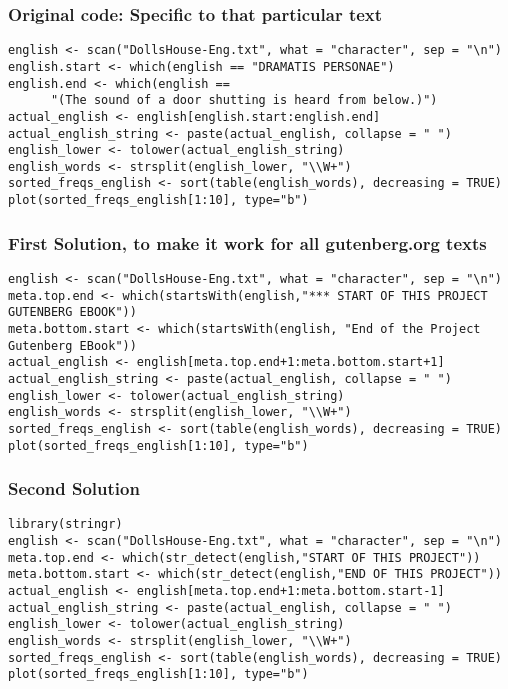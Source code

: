 \documentclass{beamer}
\begin{document}
\begin{frame}[fragile]
\frametitle{Original code: Specific to that particular text} 
\footnotesize
\begin{verbatim}
english <- scan("DollsHouse-Eng.txt", what = "character", sep = "\n")
english.start <- which(english == "DRAMATIS PERSONAE")
english.end <- which(english == 
      "(The sound of a door shutting is heard from below.)")
actual_english <- english[english.start:english.end]
actual_english_string <- paste(actual_english, collapse = " ")
english_lower <- tolower(actual_english_string)
english_words <- strsplit(english_lower, "\\W+")
sorted_freqs_english <- sort(table(english_words), decreasing = TRUE)
plot(sorted_freqs_english[1:10], type="b")
\end{verbatim}
\end{frame}

\begin{frame}[fragile]
\frametitle{First Solution, to make it work for all gutenberg.org texts}
\tiny
\begin{verbatim}
english <- scan("DollsHouse-Eng.txt", what = "character", sep = "\n")
meta.top.end <- which(startsWith(english,"*** START OF THIS PROJECT GUTENBERG EBOOK"))
meta.bottom.start <- which(startsWith(english, "End of the Project Gutenberg EBook"))
actual_english <- english[meta.top.end+1:meta.bottom.start+1]
actual_english_string <- paste(actual_english, collapse = " ")
english_lower <- tolower(actual_english_string)
english_words <- strsplit(english_lower, "\\W+")
sorted_freqs_english <- sort(table(english_words), decreasing = TRUE)
plot(sorted_freqs_english[1:10], type="b")
\end{verbatim}
\end{frame}

\begin{frame}[fragile]
\frametitle{Second Solution}
\tiny
\begin{verbatim}
library(stringr)
english <- scan("DollsHouse-Eng.txt", what = "character", sep = "\n")
meta.top.end <- which(str_detect(english,"START OF THIS PROJECT"))
meta.bottom.start <- which(str_detect(english,"END OF THIS PROJECT"))
actual_english <- english[meta.top.end+1:meta.bottom.start-1]
actual_english_string <- paste(actual_english, collapse = " ")
english_lower <- tolower(actual_english_string)
english_words <- strsplit(english_lower, "\\W+")
sorted_freqs_english <- sort(table(english_words), decreasing = TRUE)
plot(sorted_freqs_english[1:10], type="b")
\end{verbatim}
\end{frame}
\end{document}
